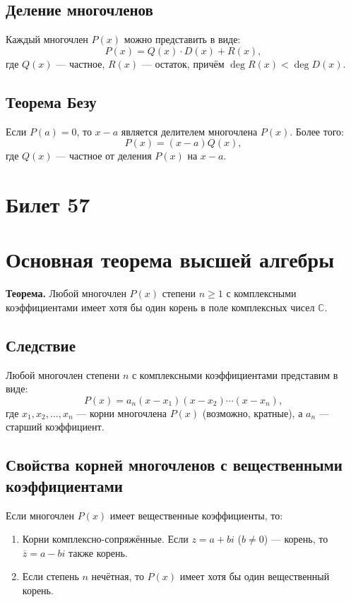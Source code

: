 \documentclass{article}
\begin{document}
\subsection*{Деление многочленов}
Каждый многочлен \( P(x) \) можно представить в виде:
\[
P(x) = Q(x) \cdot D(x) + R(x),
\]
где \( Q(x) \) — частное, \( R(x) \) — остаток, причём \( \deg R(x) < \deg D(x) \).

\subsection*{Теорема Безу}
Если \( P(a) = 0 \), то \( x - a \) является делителем многочлена \( P(x) \). Более того:
\[
P(x) = (x - a) Q(x),
\]
где \( Q(x) \) — частное от деления \( P(x) \) на \( x - a \).


\section{Билет 57}

\section*{Основная теорема высшей алгебры}
\textbf{Теорема.} Любой многочлен \( P(x) \) степени \( n \geq 1 \) с комплексными коэффициентами имеет хотя бы один корень в поле комплексных чисел \( \mathbb{C} \).

\subsection*{Следствие}
Любой многочлен степени \( n \) с комплексными коэффициентами представим в виде:
\[
P(x) = a_n (x - x_1)(x - x_2) \cdots (x - x_n),
\]
где \( x_1, x_2, \dots, x_n \) — корни многочлена \( P(x) \) (возможно, кратные), а \( a_n \) — старший коэффициент.

\subsection*{Свойства корней многочленов с вещественными коэффициентами}
Если многочлен \( P(x) \) имеет вещественные коэффициенты, то:
\begin{enumerate}
    \item Корни комплексно-сопряжённые. Если \( z = a + bi \) (\( b \neq 0 \)) — корень, то \( \overline{z} = a - bi \) также корень.
    \item Если степень \( n \) нечётная, то \( P(x) \) имеет хотя бы один вещественный корень.
\end{enumerate}
\end{document}
